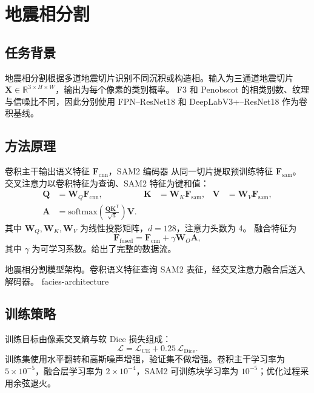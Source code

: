 \chapter{地震相分割}

\section{任务背景}

地震相分割根据多道地震切片识别不同沉积或构造相。输入为三通道地震切片
$\bm{X}\in\mathbb{R}^{3\times H\times W}$，输出为每个像素的类别概率。
F3 和 Penobscot 的相类别数、纹理与信噪比不同，因此分别使用
FPN--ResNet18 和 DeepLabV3+--ResNet18 作为卷积基线。

\section{方法原理}

卷积主干输出语义特征 $\bm{F}_{\mathrm{cnn}}$，SAM2 编码器
\cite{ravi2024sam2} 从同一切片提取预训练特征 $\bm{F}_{\mathrm{sam}}$。
交叉注意力以卷积特征为查询、SAM2 特征为键和值：
\begin{align}
  \bm{Q}&=\bm{W}_Q\bm{F}_{\mathrm{cnn}},&
  \bm{K}&=\bm{W}_K\bm{F}_{\mathrm{sam}},&
  \bm{V}&=\bm{W}_V\bm{F}_{\mathrm{sam}},\\
  \bm{A}&=\mathrm{softmax}\!\left(
    \frac{\bm{Q}\bm{K}^{\mathsf T}}{\sqrt{d}}
  \right)\bm{V}.
\end{align}
其中 $\bm{W}_Q,\bm{W}_K,\bm{W}_V$ 为线性投影矩阵，$d=128$，注意力头数为 4。
融合特征为
\begin{equation}
  \bm{F}_{\mathrm{fused}}
  =\bm{F}_{\mathrm{cnn}}+\gamma\bm{W}_O\bm{A},
\end{equation}
其中 $\gamma$ 为可学习系数。给出了完整的数据流。

  {地震相分割模型架构。卷积语义特征查询 SAM2 表征，经交叉注意力融合后送入解码器。}
  {facies-architecture}

\section{训练策略}

训练目标由像素交叉熵与软 Dice 损失组成：
\begin{equation}
  \mathcal{L}=\mathcal{L}_{\mathrm{CE}}+
  0.25\,\mathcal{L}_{\mathrm{Dice}} .
\end{equation}
训练集使用水平翻转和高斯噪声增强，验证集不做增强。卷积主干学习率为
$5\times10^{-5}$，融合层学习率为 $2\times10^{-4}$，SAM2 可训练块学习率为
$10^{-5}$；优化过程采用余弦退火。

